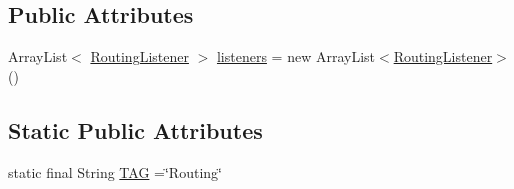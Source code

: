 \subsection*{Public Attributes}
\begin{DoxyCompactItemize}
\item 
Array\+List$<$ \hyperlink{interfacecom_1_1copelabs_1_1oiframework_1_1router_1_1_routing_listener}{Routing\+Listener} $>$ \hyperlink{classcom_1_1copelabs_1_1oiframework_1_1router_1_1_routing_a7be56b16f52fd380dc20886c7b660878}{listeners} = new Array\+List$<$\hyperlink{interfacecom_1_1copelabs_1_1oiframework_1_1router_1_1_routing_listener}{Routing\+Listener}$>$ ()
\end{DoxyCompactItemize}
\subsection*{Static Public Attributes}
\begin{DoxyCompactItemize}
\item 
static final String \hyperlink{classcom_1_1copelabs_1_1oiframework_1_1router_1_1_routing_a49b371c77210ef1dd565cc7c9217b046}{T\+A\+G} =\char`\"{}Routing\char`\"{}
\end{DoxyCompactItemize}
